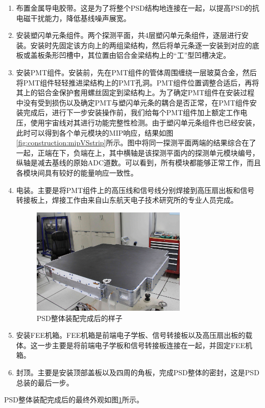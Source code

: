 \begin{enumerate}[label={\alph*)}]
	\item 布置金属导电胶带。这是为了将整个PSD结构地连接在一起，以提高PSD的抗电磁干扰能力，降低基线噪声展宽。
	\item 安装塑闪单元条组件。两个探测平面，共4层塑闪单元条组件，逐层进行安装。安装时先固定该方向上的两组梁结构，然后将单元条逐一安装到对应的底板或盖板条形凹槽中，其位置由铝合金梁结构上的“工”型凹槽决定。
	\item 安装PMT组件。安装前，先在PMT组件的管体周围缠绕一层玻莫合金，然后将PMT组件轻轻推进梁结构上的PMT孔洞。PMT组件位置调整合适后，再将其上的铝合金保护套用螺丝固定到梁结构上。为了确定PMT组件在安装过程中没有受到损伤以及确定PMT与塑闪单元条的耦合是否正常，在PMT组件安装完成后，进行下一步安装操作前，我们给每个PMT组件加上额定工作电压，使用宇宙线对其进行功能完整性检测。由于塑闪单元条组件也已经安装，此时可以得到各个单元模块的MIP响应，结果如图\ref{fig:construction:mipVSstrip}所示。图中将同一探测平面两端的结果综合在了一起，正端在下，负端在上，其中横轴是该探测平面内的探测单元模块编号，纵轴是减去基线的原始ADC道数。可以看到，所有模块都能够正常工作，而且各模块间具有较好的能量响应一致性。
	\item 电装。主要是将PMT组件上的高压线和信号线分别焊接到高压扇出板和信号转接板上，焊接工作由来自山东航天电子技术研究所的专业人员完成。
\begin{figure}[H]
	\centering
	\includegraphics[width=0.7\textwidth]{chap/construction/fig/psd.jpg}
	\caption{PSD整体装配完成后的样子}
	\label{fig:construction:psd}
\end{figure}
	\item 安装FEE机箱。FEE机箱是前端电子学板、信号转接板以及高压扇出板的载体。这一步主要是将前端电子学板和信号转接板连接在一起，并固定FEE机箱。
	\item 封顶。主要是安装顶部盖板以及四周的角板，完成PSD整体的密封，这是PSD总装的最后一步。
\end{enumerate}

PSD整体装配完成后的最终外观如图\ref{fig:construction:psd}所示。


